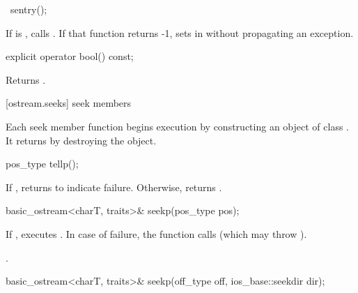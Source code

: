 %
\begin{itemdecl}
~sentry();
\end{itemdecl}

\begin{itemdescr}
\pnum
If
is
,
calls
. If that function returns -1, sets  in
 without propagating an exception.
\end{itemdescr}

%
\begin{itemdecl}
explicit operator bool() const;
\end{itemdecl}

\begin{itemdescr}
\pnum
\effects
Returns
.
\end{itemdescr}

[ostream.seeks]{ seek members}

\pnum
Each seek member function begins execution by constructing an object of class .
It returns by destroying the  object.

%
\begin{itemdecl}
pos_type tellp();
\end{itemdecl}

\begin{itemdescr}
\pnum
\returns
If
,
returns
to indicate failure.
Otherwise, returns
.
\end{itemdescr}

%
\begin{itemdecl}
basic_ostream<charT, traits>& seekp(pos_type pos);
\end{itemdecl}

\begin{itemdescr}
\pnum
\effects
If
,
executes
.
In case of failure, the function calls
(which may throw
).

\pnum
\returns
{}.
\end{itemdescr}

%
\begin{itemdecl}
basic_ostream<charT, traits>& seekp(off_type off, ios_base::seekdir dir);
\end{itemdecl}


